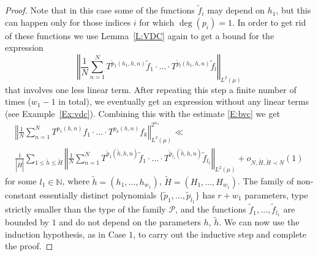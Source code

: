 \documentclass[11pt]{amsart}
\newcommand{\N}{\mathbb{N}}
\newcommand{\norm}[1]{\left\Vert #1\right\Vert}
\theoremstyle{plain}
\theoremstyle{definition}
\theoremstyle{remark}
\begin{document}
\begin{proof}
Note that in this case some of the functions $\tilde{f}_i$ may depend on
$h_{1}$, but this can happen only for those indices $i$ for which
$\deg(p_i)=1$. In order to get rid of these functions  we
use Lemma~\ref{L:VDC} again to get a bound for the expression
$$
\norm{\frac{1}{N}\sum_{n=1}^N T^{\tilde{p}_1(h_1,h,n)}\tilde{f}_1\cdot
  \ldots\cdot T^{\tilde{p}_{l}(h_1,h,n)}\tilde{f}_{l}}_{L^2(\mu)}
$$
that involves one less linear term.  After repeating this step a
finite number of times ($w_1-1$ in total), we eventually get an expression without any linear terms
(see Example~\ref{Ex:vdc}).
Combining this with the estimate \eqref{E:bvc} we get
\begin{multline}
  \norm{\frac{1}{N}\sum_{n=1}^N T^{p_1(h,n)}f_1\cdot \ldots\cdot
    T^{p_k(h,n)}f_k}_{L^2(\mu)}^{2^{w_1}}\ll\\
  \frac{1}{|\tilde{H}|}\sum_{1\leq \tilde{h}\leq \tilde{H}}\norm{\frac{1}{N}\sum_{n=1}^N
   T^{\tilde{p}_1(\tilde{h},h,n)}\tilde{f}_1\cdot \ldots\cdot
    T^{\tilde{p}_{l_1}(\tilde{h},h,n)}\tilde{f}_{l_1}}_{L^2(\mu)} +o_{N,\tilde{H}, \tilde{H}\prec N}(1)
\end{multline}
for some $l_1\in\N$, where $\tilde{h}=(h_1,\ldots,h_{w_1})$, $\tilde{H}=
(H_1,\ldots,H_{w_1})$.  The  family of non-constant essentially
distinct polynomials $\{\tilde{p}_1,\ldots,\tilde{p}_{l_1}\}$ has $r+w_1$ parameters, type
strictly smaller than the type of the family $\mathcal{P}$,
and the functions
$\tilde{f}_1,\ldots,\tilde{f}_{l_1}$ are bounded by $1$ and do not depend on the parameters $h$, $\tilde{h}$.  We can
now use the induction hypothesis, as in Case $1$, to carry out the
inductive step and complete the proof.
\end{proof}
\end{document}
